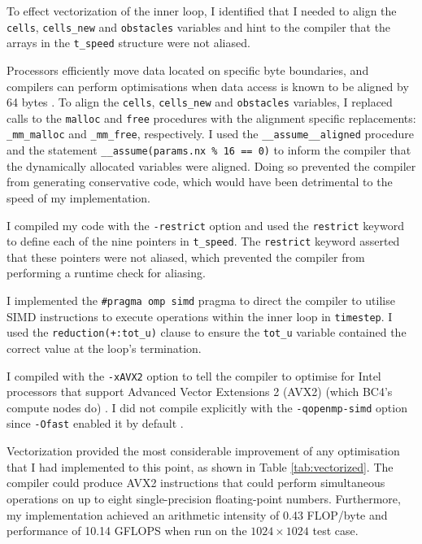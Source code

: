 \documentclass[twocolumn, a4paper]{article}
\begin{document}
To effect vectorization of the inner loop, I identified that I needed to align the \texttt{cells}, \texttt{cells\_new} and \texttt{obstacles} variables and hint to the compiler that the arrays in the \texttt{t\_speed} structure were not aliased.

Processors efficiently move data located on specific byte boundaries, and compilers can perform optimisations when data access is known to be aligned by 64 bytes \cite{alignment}.
To align the \texttt{cells}, \texttt{cells\_new} and \texttt{obstacles} variables, I replaced calls to the \texttt{malloc} and \texttt{free} procedures with the alignment specific replacements: \texttt{\_mm\_malloc} and \texttt{\_mm\_free}, respectively.
I used the \texttt{\_\_assume\_\_aligned} procedure and  the statement \texttt{\_\_assume(params.nx \% 16 == 0)} to inform the compiler that the dynamically allocated variables were aligned.
Doing so prevented the compiler from generating conservative code, which would have been detrimental to the speed of my implementation.

I compiled my code with the \texttt{-restrict} option and used the \texttt{restrict} keyword to define each of the nine pointers in \texttt{t\_speed}.
The \texttt{restrict} keyword asserted that these pointers were not aliased, which prevented the compiler from performing a runtime check for aliasing.

I implemented the \texttt{\#pragma omp simd} pragma to direct the compiler to utilise SIMD instructions to execute operations within the inner loop in \texttt{timestep}.
I used the \texttt{reduction(+:tot\_u)} clause to ensure the \texttt{tot\_u} variable contained the correct value at the loop's termination.

I compiled with the \texttt{-xAVX2} option to tell the compiler to optimise for Intel processors that support Advanced Vector Extensions 2 (AVX2) (which BC4's compute nodes do) \cite{lenovo}.
I did not compile explicitly with the \texttt{-qopenmp-simd} option since \texttt{-Ofast} enabled it by default \cite{icc}.

Vectorization provided the most considerable improvement of any optimisation that I had implemented to this point, as shown in Table \ref{tab:vectorized}.
The compiler could produce AVX2 instructions that could perform simultaneous operations on up to eight single-precision floating-point numbers.
Furthermore, my implementation achieved an arithmetic intensity of 0.43 FLOP/byte and performance of 10.14 GFLOPS when run on the $1024\times1024$ test case.
\end{document}

